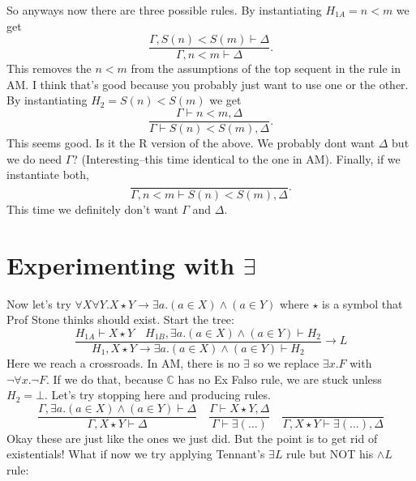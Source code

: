 \documentclass[12pt]{article}
\begin{document}
So anyways now there are three possible rules. By instantiating $H_{1A}=n<m$ we
get
\[
    \frac{\Gamma,S(n)<S(m)\vdash\Delta}{\Gamma,n<m\vdash\Delta}.
\]
This removes the $n<m$ from the assumptions of the top sequent in the rule in
AM. I think that's good because you probably just want to use one or the other.
By instantiating $H_2=S(n)<S(m)$ we get
\[
    \frac{\Gamma\vdash n<m,\Delta}{\Gamma\vdash S(n)<S(m),\Delta}.
\]
This seems good. Is it the R version of the above. We probably dont want
$\Delta$ but we do need $\Gamma$? (Interesting--this time
identical to the one in AM). Finally, if we instantiate both,
\[
    \frac{}{\Gamma,n<m\vdash S(n)<S(m),\Delta}.
\]
This time we definitely don't want $\Gamma$ and $\Delta$.

\section{Experimenting with $\exists$}

Now let's try $\forall X\forall Y.X\star Y\rightarrow\exists a.(a\in X)\wedge
(a\in Y)$ where $\star$ is a symbol that Prof Stone thinks should exist. Start
the tree:
\[
    \frac{H_{1A}\vdash X\star Y\quad H_{1B},\exists a.(a\in X)\wedge (a\in
    Y)\vdash H_2}{H_1,X\star Y\rightarrow\exists a.(a\in X)\wedge(a\in
    Y)\vdash H_2}\rightarrow L
\]
Here we reach a crossroads. In AM, there is no $\exists$ so we replace $\exists
x.F$ with $\neg\forall x.\neg F$. If we do that, because $\mathbb{C}$ has no Ex
Falso rule, we are stuck unless $H_2=\bot$. Let's try stopping here and
producing rules.
\[
    \frac{\Gamma,\exists a.(a\in X)\wedge(a\in Y)\vdash\Delta}{\Gamma,X\star
    Y\vdash\Delta}\quad \frac{\Gamma\vdash X\star Y,\Delta}{\Gamma\vdash\exists
    (\dots)}\quad \frac{}{\Gamma,X\star
    Y\vdash\exists(\dots),\Delta}
\]
Okay these are just like the ones we just did. But the point is to get rid of
existentials!  What if now we try applying Tennant's $\exists L$ rule but NOT
his $\wedge L$ rule:
\begin{prooftree}
\end{prooftree}
\end{document}
